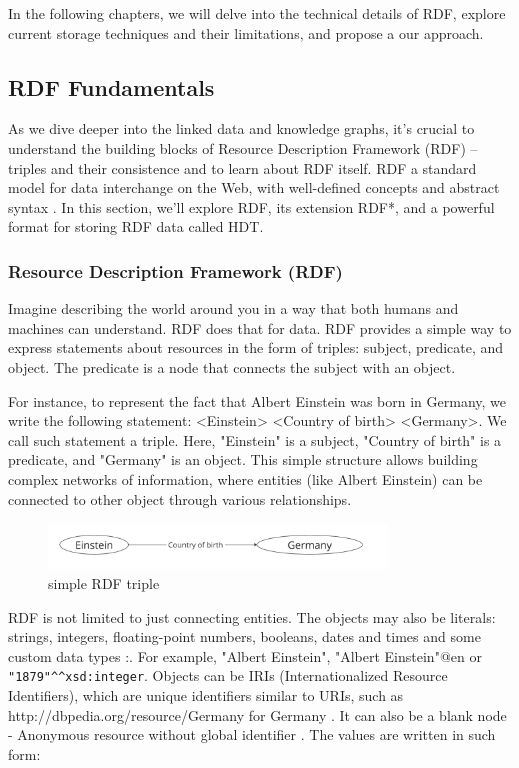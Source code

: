 In the following chapters, we will delve into the technical details of RDF, explore current storage techniques and their limitations, and propose a our approach.

\subsection{RDF Fundamentals}

As we dive deeper into the linked data and knowledge graphs, it's crucial to understand the building blocks of Resource Description Framework (RDF) – triples and their consistence and to learn about RDF itself. RDF a standard model for data interchange on the Web, with well-defined concepts and abstract syntax \citep{cyganiak2014rdf}. In this section, we'll explore RDF, its extension RDF*, and a powerful format for storing RDF data called HDT.

\subsubsection{Resource Description Framework (RDF)}

Imagine describing the world around you in a way that both humans and machines can understand. RDF does that for data. RDF provides a simple way to express statements about resources in the form of triples: subject, predicate, and object. The predicate is a node that connects the subject with an object.

For instance, to represent the fact that Albert Einstein was born in Germany, we write the following statement: <Einstein> <Country of birth> <Germany>. We call such statement a triple.
Here, "Einstein" is a subject, "Country of birth" is a predicate, and "Germany" is an object. This simple structure allows building complex networks of information, where entities (like Albert Einstein) can be connected to other object through various relationships.

\begin{figure}[htbp]
    \centering
    \includegraphics[width=0.8\textwidth]{1.png}
    \caption{simple RDF triple}
    \label{fig:image1}
\end{figure}

RDF is not limited to just connecting entities. The objects may also be literals: strings, integers, floating-point numbers, booleans, dates and times and some custom data types \citep{cyganiak2014rdf}:. For example, "Albert Einstein", "Albert Einstein"@en or \texttt{"1879"{\textasciicircum}{\textasciicircum}xsd:integer}. Objects can be IRIs (Internationalized Resource Identifiers), which are unique identifiers similar to URIs, such as http://dbpedia.org/resource/Germany for Germany \citep{cyganiak2014rdf}. It can also be a blank node - Anonymous resource without global identifier \citep{cyganiak2014rdf}. The values are written in such form:


